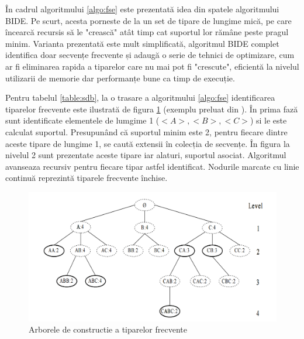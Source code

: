 În cadrul algoritmului \ref{algo:fse} este prezentată idea din spatele algoritmului BIDE. Pe scurt, acesta porneste de la un set de tipare de lungime mică, pe care încearcă recursis să le "crească" atât timp cat suportul lor rămâne peste pragul minim. Varianta prezentată este mult simplificată, algoritmul BIDE complet identifica doar secvențe frecvente și adaugă o serie de tehnici de optimizare, cum ar fi eliminarea rapida a tiparelor care nu mai pot fi "crescute", eficientă la nivelul utilizarii de memorie dar performanțe bune ca timp de execuție.

\begin{ex}
Pentru tabelul \ref{table:sdb}, la o trasare a algoritmului \ref{algo:fse} identificarea tiparelor frecvente este ilustrată de figura \ref{fig:bide-algo} (exemplu preluat din \cite{bib:wang2004bide}). În prima fază sunt identificate elementele de lumgime 1 ($<A>,<B>,<C>$) si le este calculat suportul. Presupunând că suportul minim este 2, pentru fiecare dintre aceste tipare de lungime 1, se caută extensii în colecția de secvențe. În figura la nivelul 2 sunt prezentate aceste tipare iar alaturi, suportul asociat. Algoritmul avanseaza recursiv pentru fiecare tipar astfel identificat. Nodurile marcate cu linie continuă reprezintă tiparele frecvente închise. 
\end{ex}

\begin{figure}[h]
    \centering
    \includegraphics[width=\textwidth]{figures/bide-tree.png}
    \caption{Arborele de constructie a tiparelor frecvente}
    \label{fig:bide-algo}
\end{figure}
